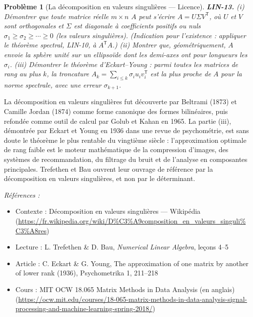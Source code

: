 \documentclass[11pt]{article}
\newtheorem{problem}{Problème}
\newenvironment{refs}{\par\small\noindent\emph{Références :}\begin{itemize}\setlength\itemsep{0pt}}{\end{itemize}\normalsize}
\begin{document}
\bigskip

\begin{problem}[{La décomposition en valeurs singulières --- Licence}]
\textbf{LIN-13.} (i) Démontrer que toute matrice réelle $m \times n$ $A$ peut
s'écrire $A = U \Sigma V^{\mathsf{T}}$, où $U$ et $V$ sont orthogonales et $\Sigma$
est diagonale à coefficients positifs ou nuls $\sigma_1 \ge \sigma_2 \ge \cdots \ge 0$ (les
\textit{valeurs singulières}). (Indication pour l'existence : appliquer le théorème spectral, LIN-10, à
$A^{\mathsf{T}} A$.) (ii) Montrer que, géométriquement, $A$ envoie la sphère unité sur un
ellipsoïde dont les demi-axes ont pour longueurs les $\sigma_i$. (iii) Démontrer le théorème
d'Eckart--Young : parmi toutes les matrices de rang au plus $k$, la troncature
$A_k = \sum_{i \le k} \sigma_i u_i v_i^{\mathsf{T}}$ est la plus proche de $A$ pour la norme
spectrale, avec une erreur $\sigma_{k+1}$.
\end{problem}

\noindent La décomposition en valeurs singulières fut découverte par Beltrami (1873) et
Camille Jordan (1874) comme forme canonique des formes bilinéaires, puis refondée comme outil de
calcul par Golub et Kahan en 1965. La partie (iii), démontrée par Eckart et Young en 1936 dans une
revue de psychométrie, est sans doute le théorème le plus rentable du vingtième siècle :
l'approximation optimale de rang faible est le moteur mathématique de la compression d'images, des
systèmes de recommandation, du filtrage du bruit et de l'analyse en composantes principales.
Trefethen et Bau ouvrent leur ouvrage de référence par la décomposition en valeurs singulières, et
non par le déterminant.

\begin{refs}
\item Contexte : Décomposition en valeurs singulières --- Wikipédia (\url{https://fr.wikipedia.org/wiki/D%C3%A9composition_en_valeurs_singuli%C3%A8res})
\item Lecture : L. Trefethen \& D. Bau, \textit{Numerical Linear Algebra}, leçons 4--5
\item Article : C. Eckart \& G. Young, \og{} The approximation of one matrix by another of lower rank \fg{} (1936), Psychometrika 1, 211--218
\item Cours : MIT OCW 18.065 Matrix Methods in Data Analysis (en anglais) (\url{https://ocw.mit.edu/courses/18-065-matrix-methods-in-data-analysis-signal-processing-and-machine-learning-spring-2018/})
\end{refs}
\end{document}
